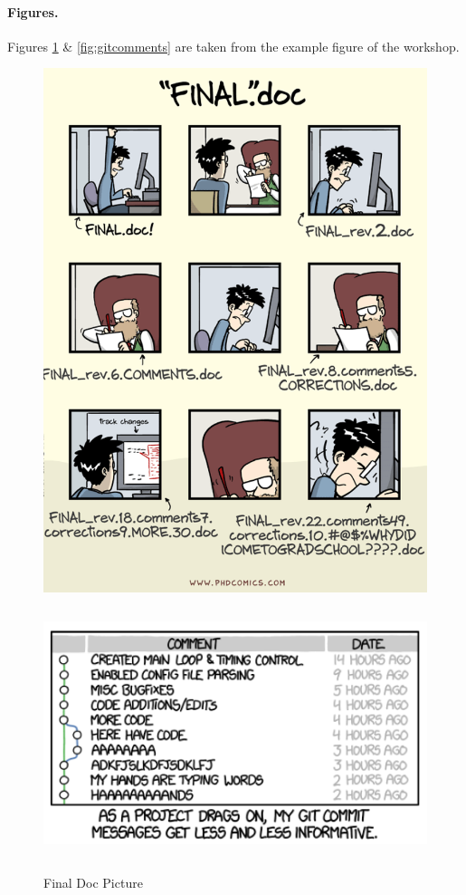 \documentclass[12pt]{article}
\begin{document}
\paragraph*{Figures.}  Figures \ref{fig:finaldoc} \& \ref{fig:gitcomments} are taken from the example figure of the workshop.

\begin{figure}[H]
      \centering
      \begin{minipage}[b]{0.4\textwidth}
            \includegraphics[width=\textwidth]{figs/finaldoc.png}
            \caption{Final Doc Picture}
            \label{fig:finaldoc}
      \end{minipage}
      \hfill
      \begin{minipage}[b]{0.5\textwidth}
            \includegraphics[width=\textwidth, height=8cm]{figs/gitcomments.png}

\end{minipage}
\end{figure}
\end{document}
